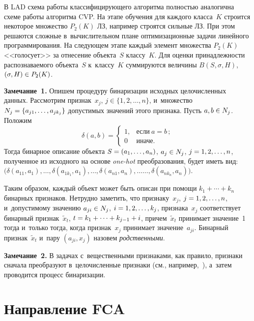 \begin{multicols}{2}
  В LAD схема работы классифицирующего алгоритма пол\-ностью аналогична 
схеме работы алгоритма CVP. На этапе обуче\-ния для каж\-до\-го класса~$K$ 
строится некоторое множество $P_2(K)$ ЛЗ, 
например строятся сильные ЛЗ. При этом решаются 
слож\-ные в~вы\-чис\-ли\-тель\-ном плане оптимизационные задачи линейного 
программирования. На следующем этапе каж\-дый элемент множества $P_2(K)$ 
<<голосует>> за отнесение объекта~$S$ классу~$K$. Для оцен\-ки 
при\-над\-леж\-ности рас\-по\-зна\-ва\-емо\-го объекта~$S$ к~классу~$K$ суммируются 
величины $B(S,\sigma, H)$, $(\sigma, H)\hm\in P_2(K)$. 
  
\smallskip

\noindent
\textbf{Замечание~1.} Опишем процедуру бинаризации исходных це\-ло\-чис\-лен\-ных данных. 
Рас\-смот\-рим признак~$x_j$, $j\in \{1,2,\ldots , n\}$, и~множество $N_j\hm= \{a_{j1}, \ldots, 
a_{jk_j}\}$ до\-пус\-ти\-мых значений этого при\-зна\-ка. Пусть $a,b\hm\in N_j$. Положим 
$$
\delta(a,b)=\begin{cases}
1, & \mbox{если}\ a=b\,;\\
0 & \mbox{иначе}.
\end{cases}
$$
 Тогда бинарное описание 
объекта $S\hm= (a_1, \ldots , a_n)$, $a_j\hm\in N_j$, $j\hm=1,2,\ldots , n$, полученное из 
исходного на основе \textit{one-hot} преобразования, будет иметь вид: $(\delta(a_{11}, a_1), 
\ldots , \delta(a_{1 k_1}, a_1) , \ldots , \delta(a_{n1}, a_n), \ldots$\linebreak $\ldots , \delta(a_{n k_n},a_n))$.
  
  Таким образом, каждый объект может быть описан при помощи $k_1+\cdots +k_n$ 
бинарных признаков. Не\-труд\-но заметить, что признаку~$x_j$, $j\hm=1,2,\ldots , n$, 
и~до\-пус\-ти\-мо\-му значению $a_{ji}\hm\in N_j$, $i\hm=1,2,\ldots, k_j$, признака~$x_j$ 
соответствует бинарный при\-знак~$\tilde{x}_t$, $t\hm= k_1+\cdots + k_{j-1} \hm+i$, 
причем~$\tilde{x}_t$ принимает значение~1 тогда и~только тогда, когда при\-знак~$x_j$ 
принимает значение~$a_{ji}$. Бинарный при\-знак~$\tilde{x}_t$ и~пару $(a_{ji}, x_j)$ назовем 
\textit{родственными}. 
  
\smallskip

\noindent
\textbf{Замечание~2.} В задачах с~вещественными признаками, как правило, при\-зна\-ки сначала 
преобразуют в~це\-ло\-чис\-лен\-ные при\-зна\-ки (см., например,~\cite{19-duk}), а~затем проводится 
процесс бинаризации.
  
\section{Направление FCA}


\end{multicols}
